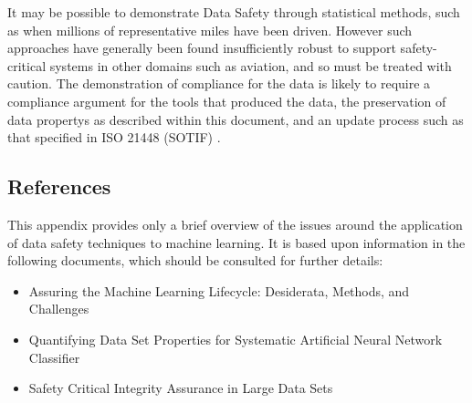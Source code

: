 It may be possible to demonstrate Data Safety through statistical methods,
such as when millions of representative miles have been driven.
However such approaches have generally been found insufficiently robust to support safety-critical systems in other domains
such as aviation, and so must be treated with caution.
The demonstration of compliance for the data is likely to require a compliance argument for the tools that produced the data,
the preservation of \glspl{data property} as described within this document, and an update process such as that specified in ISO 21448 (SOTIF)
\cite{citation:ISO21448}.

\subsection{References}
This appendix provides only a brief overview of the issues around the application of data safety techniques to machine learning. It is based upon \gls{information} in the following documents, which should be consulted for further details:
\begin{itemize}
\item Assuring the Machine Learning Lifecycle: Desiderata, Methods, and Challenges \cite{citation:Ashmore2019}
\item Quantifying Data Set Properties for Systematic Artificial Neural Network Classifier  \cite{citation:Hond2020}
\item Safety Critical Integrity Assurance in Large Data Sets \cite{citation:Sutherland2020}
\end{itemize}
